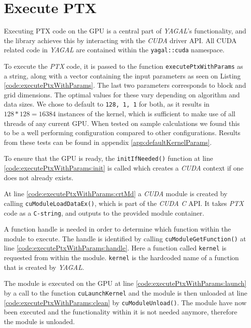 \section{Execute PTX} \label{cha:execPtx}
Executing PTX code on the GPU is a central part of \textit{YAGAL}'s functionality, and the library achieves this by interacting with the \textit{CUDA} driver API. All CUDA related code in \textit{YAGAL} are contained within the \texttt{yagal::cuda} namespace.

To execute the \textit{PTX} code, it is passed to the function \texttt{executePtxWithParams} as a string, along with a vector containing the input parameters as seen on Listing \ref{code:executePtxWithParams}. The last two parameters corresponds to block and grid dimensions. The optimal values for these vary depending on algorithm and data sizes. We chose to default to \texttt{128, 1, 1} for both, as it results in $128*128=16384$ instances of the kernel, which is sufficient to make use of all threads of any current GPU. When tested on sample calculations we found this to be a well performing configuration compared to other configurations. Results from these tests can be found in appendix \ref{app:defaultKernelParams}.

To ensure that the GPU is ready, the \texttt{initIfNeeded()} function at line \ref{code:executePtxWithParams:init} is called which creates a \textit{CUDA} context if one does not already exists.

At line \ref{code:executePtxWithParams:crtMd} a \textit{CUDA} module is created by calling \texttt{cuModuleLoadDataEx()}, which is part of the \textit{CUDA C} API. It takes \textit{PTX} code as a \texttt{C-string}, and outputs to the provided module container.

A function handle is needed in order to determine which function within the module to execute. The handle is identified by calling \texttt{cuModuleGetFunction()} at line \ref{code:executePtxWithParams:handle}. Here a function called \texttt{kernel} is requested from within the module. \texttt{kernel} is the hardcoded name of a function that is created by \textit{YAGAL}.

The module is executed on the GPU at line \ref{code:executePtxWithParams:launch} by a call to the function \texttt{cuLaunchKernel} and the module is then unloaded at line \ref{code:executePtxWithParams:clean} by \texttt{cuModuleUnload()}. The module have now been executed and the functionality within it is not needed anymore, therefore the module is unloaded.

